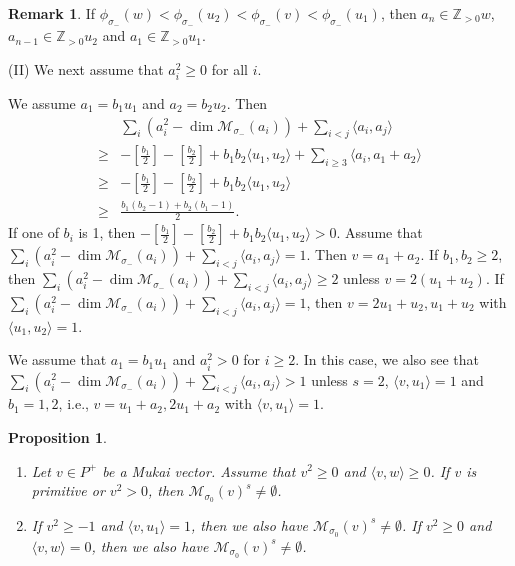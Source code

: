 \documentclass[leqno,11pt]{amsart}
\def\Z{\ensuremath{\mathbb{Z}}}
\def\dim{\mathop{\mathrm{dim}}\nolimits}
\newtheorem{Prop}[Thm]{Proposition}
\theoremstyle{definition}
\newtheorem{Rem}[Thm]{Remark}
\def\Z{\ensuremath{\mathbb{Z}}}
\def\MM{\ensuremath{\mathcal M}}
\begin{document}
\begin{Rem}\label{Rem:order}
If $\phi_{\sigma_-}(w)<\phi_{\sigma_-}(u_2)<\phi_{\sigma_-}(v)
<\phi_{\sigma_-}(u_1)$, then $a_n \in \Z_{>0}w$, $a_{n-1} \in \Z_{>0}u_2$
and $a_1 \in \Z_{>0} u_1$.
\end{Rem}

(II) We next assume that $a_i^2 \geq 0$ for all $i$.
 

We assume $a_1=b_1 u_1$ and $a_2=b_2 u_2$.
Then 
 \begin{equation}
\begin{split}
& \sum_i (a_i^2-\dim \MM_{\sigma_-}(a_i))+\sum_{i<j}\langle a_i,a_j \rangle\\
\geq &
-[\tfrac{b_1}{2}]-[\tfrac{b_2}{2}]+b_1 b_2 \langle u_1,u_2 \rangle
+\sum_{i \geq 3} \langle a_i,a_1+a_2 \rangle\\
\geq & 
-[\tfrac{b_1}{2}]-[\tfrac{b_2}{2}]+b_1 b_2 \langle u_1,u_2 \rangle\\
\geq & \frac{b_1(b_2-1)+b_2(b_1-1)}{2}.
\end{split}
\end{equation}
If one of $b_i$ is 1, then 
$-[\tfrac{b_1}{2}]-[\tfrac{b_2}{2}]+b_1 b_2 \langle u_1,u_2 \rangle>0$.
Assume that 
$\sum_i (a_i^2-\dim \MM_{\sigma_-}(a_i))+
\sum_{i<j}\langle a_i,a_j \rangle=1$.
Then $v=a_1+a_2$.
If $b_1,b_2 \geq 2$, then
$\sum_i (a_i^2-\dim \MM_{\sigma_-}(a_i))+
\sum_{i<j}\langle a_i,a_j \rangle \geq 2$
unless $v=2(u_1+u_2)$.
If $\sum_i (a_i^2-\dim \MM_{\sigma_-}(a_i))+
\sum_{i<j}\langle a_i,a_j \rangle=1$,
then $v=2 u_1+u_2, u_1+u_2$ with $\langle u_1,u_2 \rangle=1$.


We assume that $a_1=b_1 u_1$ and $a_i^2>0$ for $i \geq 2$.
In this case, we also see that
$\sum_i (a_i^2-\dim \MM_{\sigma_-}(a_i))+\sum_{i<j}\langle a_i,a_j \rangle>1$
unless $s=2$, 
$\langle v,u_1 \rangle=1$ and $b_1=1,2$, i.e.,
 $v=u_1+a_2,2u_1+a_2$ with $\langle v,u_1 \rangle=1$.



\begin{Prop}\label{Prop:non-empty}
\begin{enumerate}
\item[(1)]
Let $v \in P^+$ be a Mukai vector.
Assume that $v^2 \geq 0$ and $\langle v,w \rangle \geq 0$.
If $v$ is primitive or $v^2>0$, then
$\MM_{\sigma_0}(v)^s \ne \emptyset$.
\item[(2)]
If $v^2 \geq -1$ and $\langle v,u_1 \rangle=1$, then
we also have $\MM_{\sigma_0}(v)^s \ne \emptyset$.
If $v^2 \geq 0$ and $\langle v,w \rangle=0$, then
we also have $\MM_{\sigma_0}(v)^s \ne \emptyset$. 
\end{enumerate}
\end{Prop}
\end{document}
